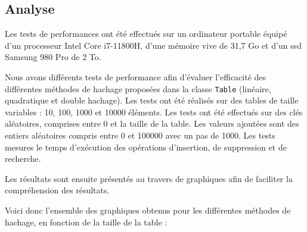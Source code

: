 \documentclass{article}
\begin{document}
    \subsection{Analyse}\label{subsec:analyse}

    Les tests de performances ont été effectués sur un ordinateur portable équipé d'un processeur Intel Core i7-11800H, d'une mémoire vive de 31,7 Go et d'un ssd Samsung 980 Pro de 2 To.

    Nous avons différents tests de performance afin d'évaluer l'efficacité des différentes méthodes de hachage proposées dans la classe \texttt{Table} (linéaire, quadratique et double hachage).
    Les tests ont été réalisés sur des tables de taille variables : 10, 100, 1000 et 10000 éléments.
    Les tests ont été effectués sur des clés aléatoires, comprises entre 0 et la taille de la table.
    Les valeurs ajoutées sont des entiers aléatoires compris entre 0 et 100000 avec un pas de 1000.
    Les tests mesures le temps d'exécution des opérations d'insertion, de suppression et de recherche.

    Les résultats sont ensuite présentés au travers de graphiques afin de faciliter la compréhension des résultats.

    Voici donc l'ensemble des graphiques obtenus pour les différentes méthodes de hachage, en fonction de la taille de la table :

    \newpage
\end{document}
